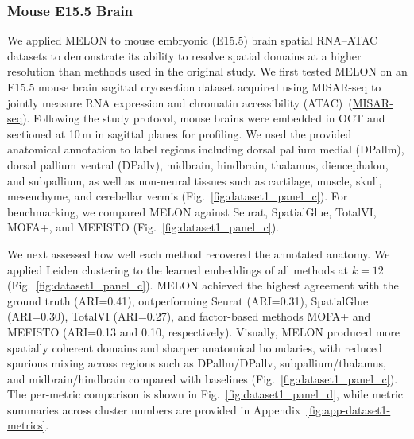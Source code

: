\documentclass{article}
\theoremstyle{plain}
\theoremstyle{definition}
\begin{document}
\subsubsection{Mouse E15.5 Brain}
We applied MELON to mouse embryonic (E15.5) brain spatial RNA--ATAC datasets to demonstrate its ability to resolve spatial domains at a higher resolution than methods used in the original study. We first tested MELON on an E15.5 mouse brain sagittal cryosection dataset acquired using MISAR-seq to jointly measure RNA expression and chromatin accessibility (ATAC)~(\href{https://www.nature.com/articles/s41592-023-01884-1}{MISAR-seq}). Following the study protocol, mouse brains were embedded in OCT and sectioned at 10\,\textmu m in sagittal planes for profiling. We used the provided anatomical annotation to label regions including dorsal pallium medial (DPallm), dorsal pallium ventral (DPallv), midbrain, hindbrain, thalamus, diencephalon, and subpallium, as well as non-neural tissues such as cartilage, muscle, skull, mesenchyme, and cerebellar vermis (Fig.~\ref{fig:dataset1_panel_c}). For benchmarking, we compared MELON against Seurat, SpatialGlue, TotalVI, MOFA+, and MEFISTO (Fig.~\ref{fig:dataset1_panel_c}).

We next assessed how well each method recovered the annotated anatomy. We applied Leiden clustering to the learned embeddings of all methods at $k=12$ (Fig.~\ref{fig:dataset1_panel_c}). MELON achieved the highest agreement with the ground truth (ARI=0.41), outperforming Seurat (ARI=0.31), SpatialGlue (ARI=0.30), TotalVI (ARI=0.27), and factor-based methods MOFA+ and MEFISTO (ARI=0.13 and 0.10, respectively). Visually, MELON produced more spatially coherent domains and sharper anatomical boundaries, with reduced spurious mixing across regions such as DPallm/DPallv, subpallium/thalamus, and midbrain/hindbrain compared with baselines (Fig.~\ref{fig:dataset1_panel_c}). The per-metric comparison is shown in Fig.~\ref{fig:dataset1_panel_d}, while metric summaries across cluster numbers are provided in Appendix~\ref{fig:app-dataset1-metrics}.
\end{document}
